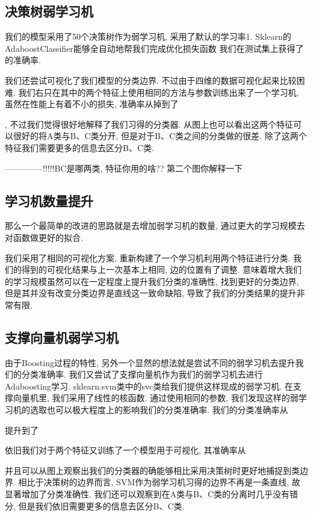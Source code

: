 \documentclass[lang=cn,11pt]{elegantpaper}
\begin{document}
\subsection{决策树弱学习机}

我们的模型采用了50个决策树作为弱学习机, 采用了默认的学习率1. Sklearn的AdaboostClassifier能够全自动地帮我们完成优化损失函数%
我们在测试集上获得了
的准确率. 


我们还尝试可视化了我们模型的分类边界. 不过由于四维的数据可视化起来比较困难. 我们右只在其中的两个特征上使用相同的方法与参数训练出来了一个学习机, 虽然在性能上有着不小的损失, 准确率从掉到了

, 不过我们觉得很好地解释了我们习得的分类器. 从图上也可以看出这两个特征可以很好的将A类与B、C类分开, 但是对于B、C类之间的分类做的很差. 除了这两个特征我们需要更多的信息去区分B、C类. 

--------------!!!!!BC是哪两类, 特征你用的啥?? 第二个图你解释一下


\subsection{学习机数量提升}


那么一个最简单的改进的思路就是去增加弱学习机的数量, 通过更大的学习规模去对函数做更好的拟合. 




我们采用了相同的可视化方案, 重新构建了一个学习机利用两个特征进行分类. 我们的得到的可视化结果与上一次基本上相同, 边的位置有了调整. 意味着增大我们的学习规模虽然可以在一定程度上提升我们分类的准确性, 找到更好的分类边界, 但是其并没有改变分类边界是直线这一致命缺陷, 导致了我们的分类结果的提升非常有限.

\subsection{支撑向量机弱学习机}

由于Boosting过程的特性, 另外一个显然的想法就是尝试不同的弱学习机去提升我们的分类准确率. 我们又尝试了支撑向量机作为我们的弱学习机去进行Adaboosting学习. sklearn.svm类中的svc类给我们提供这样现成的弱学习机. 在支撑向量机里, 我们采用了线性的核函数. 通过使用相同的参数, 我们发现这样的弱学习机的选取也可以极大程度上的影响我们的分类准确率. 我们的分类准确率从%

提升到了

依旧我们对于两个特征又训练了一个模型用于可视化, 其准确率从

并且可以从图上观察出我们的分类器的确能够相比采用决策树时更好地捕捉到类边界. 相比于决策树的边界而言, SVM作为弱学习机习得的边界不再是一条直线, 故显著增加了分类准确性. 我们还可以观察到在A类与B、C类的分离时几乎没有错分, 但是我们依旧需要更多的信息去区分B、C类.



\newpage
\nocite{*}



\end{document}
